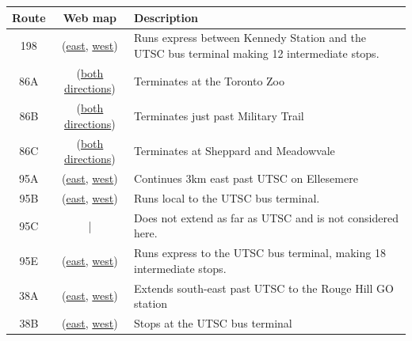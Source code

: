 \documentclass{article}
\begin{document}
	\begin{center}
		\begin{tabular}{ c | c | p{7cm} }
			\textbf{Route} & \textbf{Web map} & \textbf{Description} \\
			\hline
			198 & (\href{https://www.openstreetmap.org/relation/7906759}{east}, \href{https://www.openstreetmap.org/relation/8265811}{west}) & Runs express between Kennedy Station and the UTSC bus terminal making 12 intermediate stops. \\
			\hline
			86A & (\href{https://www.openstreetmap.org/relation/7890415}{both directions}) & Terminates at the Toronto Zoo \\
			\hline
			86B & (\href{https://www.openstreetmap.org/relation/7890416}{both directions}) & Terminates just past Military Trail\\
			\hline
			86C & (\href{https://www.openstreetmap.org/relation/283248}{both directions}) & Terminates at Sheppard and Meadowvale\\
			\hline
			95A & (\href{https://www.openstreetmap.org/relation/122331}{east}, \href{https://www.openstreetmap.org/relation/8265932}{west}) & Continues 3km east past UTSC on Ellesemere \\
			\hline
			95B & (\href{https://www.openstreetmap.org/relation/8267860}{east}, \href{https://www.openstreetmap.org/relation/8267859}{west}) & Runs local to the UTSC bus terminal. \\
			\hline
			95C & | & Does not extend as far as UTSC and is not considered here. \\
			\hline
			95E & (\href{https://www.openstreetmap.org/relation/8267989}{east}, \href{https://www.openstreetmap.org/relation/8267990}{west}) & Runs express to the UTSC bus terminal, making 18 intermediate stops. \\
			\hline
			38A & (\href{https://www.openstreetmap.org/relation/8265995}{east}, \href{https://www.openstreetmap.org/relation/90087}{west}) & Extends south-east past UTSC to the Rouge Hill GO station \\
			\hline
			38B & (\href{https://www.openstreetmap.org/relation/7886597}{east}, \href{https://www.openstreetmap.org/relation/8267814}{west}) & Stops at the UTSC bus terminal \\
		\end{tabular}
		\label{t:route-variants}
	\end{center}
\end{document}
